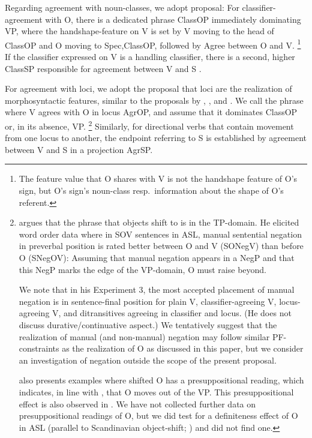 \documentclass[output=paper,colorlinks,citecolor=brown,
]{langscibook}
\begin{document}
Regarding agreement with noun-classes, we adopt 
proposal: For classifier-agreement with O, there is
a dedicated phrase ClassOP immediately dominating VP, where the
handshape-feature on V is set by V moving to the head of ClassOP and O
moving to Spec,ClassOP, followed by Agree between O and V.%
\footnote{
    The feature value that O shares with V is not the handshape feature of O’s
    sign, but O’s sign’s noun-class resp.~information about the shape of O’s referent.
}
If the
classifier expressed on V is a handling classifier, there is a second,
higher ClassSP responsible for agreement between V and S \citep{Benedicto.Brentari.2004}.

For agreement with loci, we adopt the proposal that loci are the
realization of morphosyntactic features, similar to the proposals by
\citet{Neidle.etal.2000}, \citet{Kuhn.2016}, and \citet{Pfau.etal.2018}. We call the
phrase where V agrees with O in locus AgrOP, and assume that it
dominates ClassOP or, in its absence, VP.%
\footnote{
    \citet{Gokgoz.2013} argues that the phrase that objects shift to is in the
    TP-domain. He elicited word order data where in SOV sentences in ASL, manual
    sentential negation in preverbal position is rated better between O and V (SONegV)
    than before O (SNegOV): Assuming that manual negation appears in a NegP and
    that this NegP marks the edge of the VP-domain, O must raise beyond.
    
    We note that in his Experiment 3, the most accepted placement of manual
    negation is in sentence-final position for plain V, classifier-agreeing V,
    locus-agreeing V, and ditransitives agreeing in classifier and locus. (He does not
    discuss durative/continuative aspect.) We tentatively suggest that the realization of
    manual (and non-manual) negation may follow similar PF-constraints as the
    realization of O as discussed in this paper, but we consider an investigation of
    negation outside the scope of the present proposal.
    
    \citeauthor{Gokgoz.2013} also presents examples where shifted O has a presuppositional
    reading, which indicates, in line with \citet{Diesing1992}, that O moves out of the VP.
    This presuppositional effect is also observed in \citet{Napoli.SS.RMQ.2017}. We have not
    collected further data on presuppositional readings of O, but we did test for a
    definiteness effect of O in ASL (parallel to Scandinavian object-shift; \citealp{Holmberg:1986})
    and did not find one.
}
Similarly, for
directional verbs that contain movement from one locus to another, the
endpoint referring to S is established by agreement between V and S
in a projection AgrSP.
\end{document}
